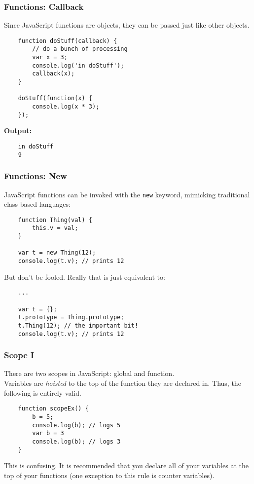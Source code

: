 \documentclass{lug}
\begin{document}
\begin{frame}[fragile]
    \frametitle{Functions: Callback}
    Since JavaScript functions are objects, they can be passed just like other objects.

    \begin{verbatim}
    function doStuff(callback) {
        // do a bunch of processing
        var x = 3;
        console.log('in doStuff');
        callback(x);
    }

    doStuff(function(x) {
        console.log(x * 3);
    });
    \end{verbatim}

    \textbf{Output:}
    \begin{verbatim}
    in doStuff
    9
    \end{verbatim}
\end{frame}

\begin{frame}[fragile]
    \frametitle{Functions: New}
    JavaScript functions can be invoked with the \texttt{new} keyword, mimicking traditional
    class-based languages:

    \begin{verbatim}
    function Thing(val) {
        this.v = val;
    }

    var t = new Thing(12);
    console.log(t.v); // prints 12
    \end{verbatim}

    But don't be fooled. Really that is just equivalent to:

    \begin{verbatim}
    ...

    var t = {};
    t.prototype = Thing.prototype;
    t.Thing(12); // the important bit!
    console.log(t.v); // prints 12
    \end{verbatim}
\end{frame}

\begin{frame}[fragile]
    \frametitle{Scope I}

    There are two scopes in JavaScript: global and function.\footnotemark[1]\\

    Variables are \textit{hoisted} to the top of the function they are declared in. Thus, the
    following is entirely valid.

    \begin{verbatim}
    function scopeEx() {
        b = 5;
        console.log(b); // logs 5
        var b = 3
        console.log(b); // logs 3
    }
    \end{verbatim}

    This is confusing. It is recommended that you declare all of your variables at the top of your
    functions (one exception to this rule is counter variables).

\end{frame}
\end{document}
